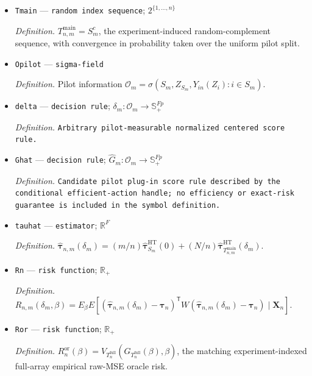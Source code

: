 \documentclass{article}
\begin{document}
\begin{itemize}
  \par\smallskip\noindent\emph{Definition.} Uniform random pilot subset \(S_m\), drawn before its balanced complete randomization.
  \item \texttt{Tmain} --- \texttt{random index sequence}; \(2^{\{1,\ldots,n\}}\)
  \par\smallskip\noindent\emph{Definition.} \(T_{n,m}^{\mathrm{main}}=S_m^c\), the experiment-induced random-complement sequence, with convergence in probability taken over the uniform pilot split.
  \item \texttt{Opilot} --- \texttt{sigma-\allowbreak{}field}
  \par\smallskip\noindent\emph{Definition.} Pilot information \(\mathcal O_m=\sigma(S_m,Z_{S_m},Y_{in}(Z_i):i\in S_m)\).
  \item \texttt{delta} --- \texttt{decision rule}; \(\delta_m:\mathcal O_m\to\mathbb S_{+}^{Fp}\)
  \par\smallskip\noindent\emph{Definition.} \texttt{Arbitrary pilot-\allowbreak{}measurable normalized centered score rule.}
  \item \texttt{Ghat} --- \texttt{decision rule}; \(\widehat G_m:\mathcal O_m\to\mathbb S_+^{Fp}\)
  \par\smallskip\noindent\emph{Definition.} \texttt{Candidate pilot plug-\allowbreak{}in score rule described by the conditional efficient-\allowbreak{}action handle;\allowbreak{} no efficiency or exact-\allowbreak{}risk guarantee is included in the symbol definition.}
  \item \texttt{tauhat} --- \texttt{estimator}; \(\mathbb R^{F}\)
  \par\smallskip\noindent\emph{Definition.} \(\widehat{\boldsymbol\tau}_{n,m}(\delta_m)=(m/n)\widehat{\boldsymbol\tau}^{\mathrm{HT}}_{S_m}(0)+(N/n)\widehat{\boldsymbol\tau}^{\mathrm{HT}}_{T_{n,m}^{\mathrm{main}}}(\delta_m)\).
  \item \texttt{Rn} --- \texttt{risk function}; \(\mathbb R_{+}\)
  \par\smallskip\noindent\emph{Definition.} \(R_{n,m}(\delta_m,\beta)=E_{\beta}E[(\widehat{\boldsymbol\tau}_{n,m}(\delta_m)-\boldsymbol\tau_n)^{\mathsf T}W(\widehat{\boldsymbol\tau}_{n,m}(\delta_m)-\boldsymbol\tau_n)\mid\mathbf X_n]\).
  \item \texttt{Ror} --- \texttt{risk function}; \(\mathbb R_{+}\)
  \par\smallskip\noindent\emph{Definition.} \(R_n^{\mathrm{or}}(\beta)=V_{T_n^{\mathrm{full}}}(G_{T_n^{\mathrm{full}}}(\beta),\beta)\), the matching experiment-indexed full-array empirical raw-MSE oracle risk.

\end{itemize}
\end{document}
